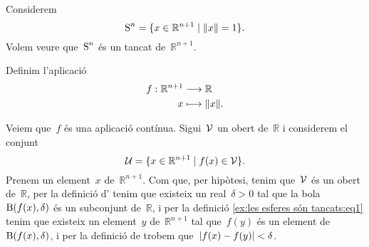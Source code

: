 \documentclass[../../main.tex]{subfiles}
\begin{document}
    \begin{example}
        \label{ex:les esferes són tancats}
        Considerem
        \[
            \esfera^{n}=\{x\in\mathbb{R}^{n+1}\mid\norm{x}=1\}.
        \]
        Volem veure que~\(\operatorname{S}^{n}\) és un tancat de~\(\mathbb{R}^{n+1}\).
    \end{example}
    \begin{solution}
        Definim l'aplicació
        \begin{align*}
            f:\mathbb{R}^{n+1}&\longrightarrow\mathbb{R} \\
            x&\longmapsto\norm{x}.
        \end{align*}
        \begin{comment}
            Veiem que~\(f\) és una aplicació tancada.
            Sigui~\(\tancat{C}\) un tancat de~\(\mathbb{R}^{n+1}\) i considerem el conjunt
            \[
                \tancat{K}=\{f(x)\in\mathbb{R}\mid x\in\tancat{C}\}.
            \]
            Tenim que~\(\tancat{K}\) és un tancat de~\(\mathbb{R}\), ja que si~\(y\) és un element de~\(\tancat{K}\), aleshores~\(y\neq f(x)\) per a tot~\(x\) de~\(\obert{C}\), i per tant existeix un real~\(d>0\) tal que
            \[
                d=\min_{x\in\tancat{C}}\abs{f(x)-y},
            \]
            i per tant tenim que per a tot~\(y\) de~\(\mathbb{R}\setminus\tancat{K}\) existeix una bola~\(\bola(y,d)\) tal que~\(\bola(y,d)\cap\tancat{K}=\emptyset\), i per la definició d'\myref{def:obert espai mètric} trobem que~\(\mathbb{R}\setminus\tancat{K}\) és un obert de~\(\mathbb{R}\).
            Aleshores per la definició de \myref{def:tancat} trobem que~\(\tancat{K}\) és un tancat, i per la definició d'\myref{def:aplicació tancada} trobem que~\(f\) és una aplicació tancada.

            Ara bé, tenim que~\(\{1\}\) és un tancat de~\(\mathbb{R}\)
        \end{comment}
        Veiem que~\(f\) és una aplicació contínua.
        Sigui~\(\mathcal{V}\) un obert de~\(\mathbb{R}\) i considerem el conjunt
        \begin{equation}
            \label{ex:les esferes són tancats:eq1}
            \mathcal{U}=\{x\in\mathbb{R}^{n+1}\mid f(x)\in\mathcal{V}\}.
        \end{equation}
        Prenem un element~\(x\) de~\(\mathbb{R}^{n+1}\).
        Com que, per hipòtesi, tenim que~\(\mathcal{V}\) és un obert de~\(\mathbb{R}\), per la definició d' tenim que existeix un real~\(\delta>0\) tal que la bola~\(\operatorname{B}(f(x),\delta)\) és un subconjunt de~\(\mathbb{R}\), i per la definició \eqref{ex:les esferes són tancats:eq1} tenim que existeix un element~\(y\) de~\(\mathbb{R}^{n+1}\) tal que~\(f(y)\) és un element de~\(\operatorname{B}(f(x),\delta)\), i per la definició de  trobem que~\(\abs{f(x)-f(y)}<\delta\).
    \end{solution}
\end{document}
